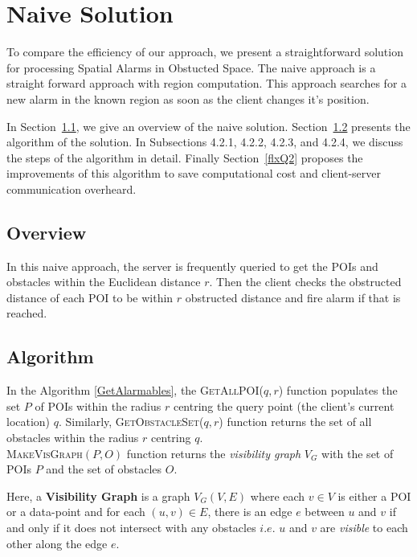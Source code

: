 \chapter{Naive Solution}
\label{chap:naivesoln}

To compare the efficiency of our approach, we present a straightforward solution for processing Spatial Alarms in Obstucted Space. The naive approach is a straight forward approach with region computation.  This approach searches for a new alarm in the known region as soon as the client changes it's position.


In Section~\ref{naiveview}, we give an overview of the naive solution. Section~\ref{naivealgo} presents the algorithm of the solution. In Subsections 4.2.1, 4.2.2, 4.2.3, and 4.2.4, we discuss the steps of the algorithm in detail. Finally Section~\ref{flxQ2} proposes the improvements of this algorithm to save computational cost and client-server communication overheard.

\vspace*{12pt}

\section{Overview}
\label{naiveview}
In this naive approach, the server is frequently queried to get the POIs and obstacles within the Euclidean distance $r$. Then the client checks the obstructed distance of each POI to be within $r$ obstructed distance and fire alarm if that is reached.\\


\vspace*{12pt}

\section{Algorithm}
\label{naivealgo}

In the Algorithm \ref{GetAlarmables}, the \textsc{GetAllPOI}($q, r$) function populates the set $P$ of POIs within the radius $r$ centring the query point (the client's current location) $q$. Similarly, \textsc{GetObstacleSet}($q, r$) function returns the set of all obstacles within the radius $r$ centring $q$.\\

\textsc{MakeVisGraph}$(P,O)$ function returns the \textit{visibility graph} $V_G$ with the set of POIs $P$ and the set of obstacles $O$.

Here, a \textbf{Visibility Graph} is a graph $V_G(V,E)$ where each $v \in V$ is either a POI or a data-point and for each $(u,v) \in E$, there is an edge $e$ between $u$ and $v$ if and only if it does not intersect with any obstacles $i.e.$ $u$ and $v$ are \textit{visible} to each other along the edge $e$.\\

